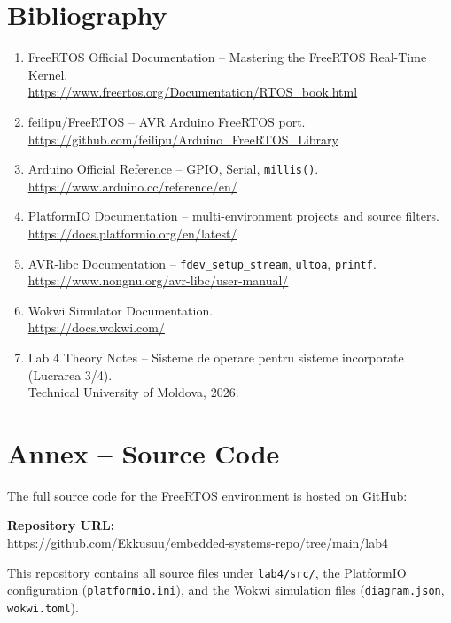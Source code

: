 \documentclass[12pt]{article}
\begin{document}
\section*{Bibliography}
\begin{enumerate}
    \item FreeRTOS Official Documentation -- Mastering the FreeRTOS Real-Time Kernel.\\
    \url{https://www.freertos.org/Documentation/RTOS_book.html}

    \item feilipu/FreeRTOS -- AVR Arduino FreeRTOS port.\\
    \url{https://github.com/feilipu/Arduino_FreeRTOS_Library}

    \item Arduino Official Reference -- GPIO, Serial, \texttt{millis()}.\\
    \url{https://www.arduino.cc/reference/en/}

    \item PlatformIO Documentation -- multi-environment projects and source filters.\\
    \url{https://docs.platformio.org/en/latest/}

    \item AVR-libc Documentation -- \texttt{fdev\_setup\_stream}, \texttt{ultoa}, \texttt{printf}.\\
    \url{https://www.nongnu.org/avr-libc/user-manual/}

    \item Wokwi Simulator Documentation.\\
    \url{https://docs.wokwi.com/}

    \item Lab 4 Theory Notes -- Sisteme de operare pentru sisteme incorporate (Lucrarea 3/4).\\
    Technical University of Moldova, 2026.
\end{enumerate}

\pagebreak
\section*{Annex -- Source Code}

The full source code for the FreeRTOS environment is hosted on GitHub:

\bigskip
\noindent\textbf{Repository URL:}\\
\url{https://github.com/Ekkusuu/embedded-systems-repo/tree/main/lab4}

\bigskip
\noindent This repository contains all source files under \texttt{lab4/src/}, the PlatformIO configuration (\texttt{platformio.ini}), and the Wokwi simulation files (\texttt{diagram.json}, \texttt{wokwi.toml}).
\end{document}
